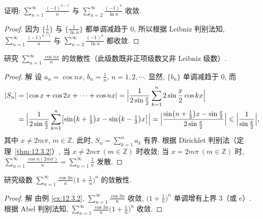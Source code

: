 \begin{example}\label{ex:12.3.1}
证明: $\sum_{n=1}^{\infty}\frac{(-1)^{n-1}}{n}$ 与 $\sum_{n=2}^{\infty}\frac{(-1)^{n}}{\ln n}$ 收敛.
\end{example}

\begin{proof}
因为 $\bigl\{\frac{1}{n}\bigr\}$ 与 $\bigl\{\frac{1}{\ln n}\bigr\}$ 都单调减趋于 $0$, 所以根据 Leibniz 判别法知, $\sum_{n=1}^{\infty}\frac{(-1)^{n-1}}{n}$ 与 $\sum_{n=2}^{\infty}\frac{(-1)^{n}}{\ln n}$ 都收敛.
\end{proof}

\begin{example}\label{ex:12.3.2}
研究 $\sum_{n=1}^{\infty}\frac{\cos nx}{n}$ 的敛散性（此级数既非正项级数又非 Leibniz 级数）.
\end{example}

\begin{proof}
解 设 $a_{n}=\cos nx$, $b_{n}=\frac{1}{n}$, $n=1,2,\cdots$. 显然, $\{b_{n}\}$ 单调减趋于 $0$, 而
\[
\begin{aligned}
  |S_{n}|
  &=|\cos x+\cos 2x+\cdots+\cos nx|
   =\Bigl|\frac{1}{2\sin\frac{x}{2}}\sum_{k=1}^{n}2\sin\frac{x}{2}\cos kx\Bigr|\\
  &=\Bigl|\frac{1}{2\sin\frac{x}{2}}\sum_{k=1}^{n}\bigl[\sin\bigl(k+\tfrac{1}{2}\bigr)x-\sin\bigl(k-\tfrac{1}{2}\bigr)x\bigr]\Bigr|
   =\Bigl|\frac{\sin\bigl(n+\tfrac{1}{2}\bigr)x-\sin\frac{x}{2}}{2\sin\frac{x}{2}}\Bigr|
   \leqslant\Bigl|\frac{1}{\sin\frac{x}{2}}\Bigr|,
\end{aligned}
\]
其中 $x\neq 2m\pi$, $m\in\mathbb{Z}$. 此时, $S_{n}=\sum_{k=1}^{n}a_{k}$ 有界. 根据 Dirichlet 判别法（定理~\ref{thm:12.3.2}）, 当 $x\neq 2m\pi\ (m\in\mathbb{Z})$ 时收敛; 当 $x=2m\pi\ (m\in\mathbb{Z})$ 时, $\sum_{n=1}^{\infty}\frac{\cos n(2m\pi)}{n}=\sum_{n=1}^{\infty}\frac{1}{n}$ 发散.
\end{proof}

\begin{example}\label{ex:12.3.3}
研究级数 $\sum_{n=1}^{\infty}\frac{\cos 3n}{n}\bigl(1+\frac{1}{n}\bigr)^{n}$ 的敛散性.
\end{example}

\begin{proof}
解 由例 \ref{ex:12.3.2}, $\sum_{n=1}^{\infty}\frac{\cos 3n}{n}$ 收敛, $\bigl(1+\frac{1}{n}\bigr)^{n}$ 单调增有上界 $3$（或 $\mathrm{e}$）. 根据 Abel 判别法知, $\sum_{n=1}^{\infty}\frac{\cos 3n}{n}\bigl(1+\frac{1}{n}\bigr)^{n}$ 收敛.
\end{proof}

